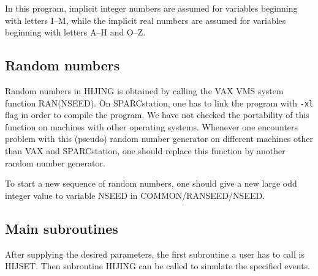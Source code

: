         In this program, implicit integer numbers are assumed for 
variables beginning with letters I--M, while the implicit real numbers
are assumed for variables beginning with letters A--H and O--Z. 

\subsection{Random numbers}

        Random numbers in HIJING is obtained by calling the
VAX VMS system function RAN(NSEED). On SPARCstation, one has to
link the program with {\tt -xl} flag in order to compile the program.
We have not checked the portability of this function on machines
with other operating systems. Whenever one encounters problem with
this (pseudo) random number generator on different machines other
than VAX and SPARCstation, one should replace this function by
another random number generator.

        To start a new sequence of random numbers, one should give
a new large odd integer value to variable NSEED in 
COMMON/RANSEED/NSEED.


\subsection{Main subroutines}

        After supplying the desired parameters, the first subroutine a
user has to call is HIJSET. Then subroutine HIJING can be called to
simulate the specified events.

